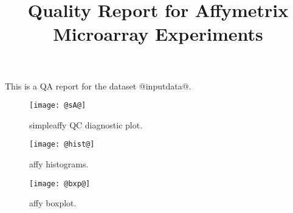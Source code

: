 \documentclass{article}
\begin{document}
\title{Quality Report for Affymetrix Microarray Experiments}

\maketitle

This is a QA report for the dataset @inputdata@.

\begin{figure}[tp]
  \centering
\texttt{[image: @sA@]}

\caption{\label{fig:sA}%
simpleaffy QC diagnostic plot.}
\end{figure}

\begin{figure}[tp]
  \centering
\texttt{[image: @hist@]}

\caption{\label{fig:sA}%
affy histograms.}
\end{figure}

\begin{figure}[tp]
  \centering
\texttt{[image: @bxp@]}

\caption{\label{fig:sA}%
affy boxplot.}
\end{figure}
\end{document}
